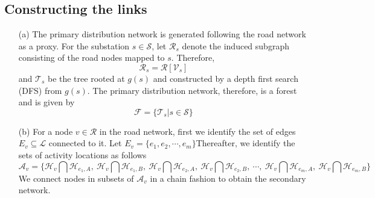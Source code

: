 \documentclass[12pt]{article}
\begin{document}
	\subsection{Constructing the links}\label{subsec:link}
	\begin{enumerate}
		\item[(a)] The primary distribution network is generated following the road network as a proxy. For the substation $s\in\mathcal{S}$, let $\mathcal{R}_s$ denote the induced subgraph consisting of the road nodes mapped to $s$. Therefore,
		\begin{equation}\mathcal{R}_s=\mathcal{R}[\mathcal{V}_s]\end{equation}
		and $\mathcal{T}_s$ be the tree rooted at $g(s)$ and constructed by a depth first search (DFS) from $g(s)$. The primary distribution network, therefore, is a forest and is given by
		\begin{equation}\mathcal{F}=\{\mathcal{T}_s|s\in\mathcal{S}\}\end{equation}
		
		\item[(b)] For a node $v\in\mathcal{R}$ in the road network, first we identify the set of edges $E_v\subseteq\mathcal{L}$ connected to it. Let $E_v=\{e_1,e_2,\cdots,e_m\}$Thereafter, we identify the sets of activity locations as follows
		\begin{equation}
		\mathcal{A}_v=\bigg\{\mathcal{H}_v\bigcap\mathcal{H}_{e_1,A},\ \mathcal{H}_v\bigcap\mathcal{H}_{e_1,B},\ \mathcal{H}_v\bigcap\mathcal{H}_{e_2,A},\ \mathcal{H}_v\bigcap\mathcal{H}_{e_2,B},\ \cdots,\  \mathcal{H}_v\bigcap\mathcal{H}_{e_m,A},\ \mathcal{H}_v\bigcap\mathcal{H}_{e_m,B} \bigg\}
		\end{equation}
		We connect nodes in subsets of $\mathcal{A}_v$ in a chain fashion to obtain the secondary network.
	\end{enumerate}
\end{document}
